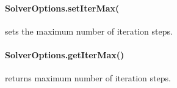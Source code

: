 \paragraph{SolverOptions.setIterMax(
}
sets the maximum number of iteration steps.


\paragraph{SolverOptions.getIterMax()}
returns maximum number of iteration steps.


%


%


%


%


%


%


